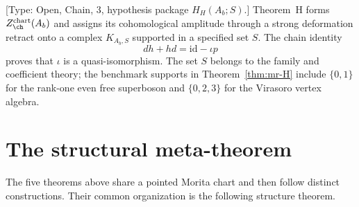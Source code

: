 \begin{corollary}
\label{cor:mr-H}
\textup{[Type: Open, Chain, $3$, hypothesis package $H_H(A_b;S)$.]}
Theorem~H forms $Z_{\ch}^{\mathrm{chart}}(A_b)$ and assigns its
cohomological amplitude through a strong deformation retract onto a
complex $K_{A_b,S}$ supported in a specified set $S$.  The chain
identity
\[
 dh+hd=\mathrm{id}-\iota p
\]
proves that $\iota$ is a quasi-isomorphism.  The set $S$ belongs to
the family and coefficient theory; the benchmark supports in
Theorem~\ref{thm:mr-H} include $\{0,1\}$ for the rank-one even free
superboson and $\{0,2,3\}$ for the Virasoro vertex algebra.
\end{corollary}

\section{The structural meta-theorem}
\label{sec:mr-meta}

The five theorems above share a pointed Morita chart and then
follow distinct constructions.  Their common organization is the following
structure theorem.

